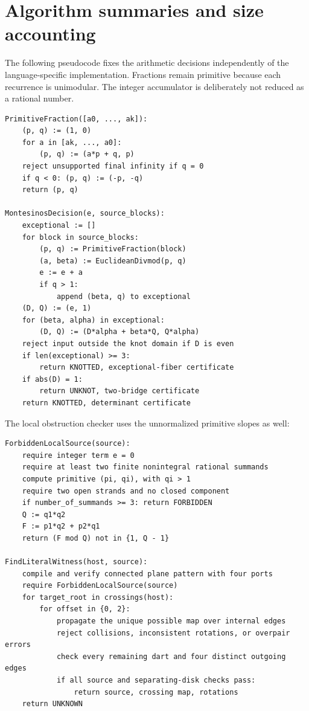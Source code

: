 \documentclass[11pt,a4paper]{article}
\theoremstyle{definition}
\theoremstyle{remark}
\numberwithin{equation}{section}
\begin{document}
\appendix
\section{Algorithm summaries and size accounting}
\label{sec:appendix}

The following pseudocode fixes the arithmetic decisions independently of
the language-specific implementation. Fractions remain primitive because
each recurrence is unimodular. The integer accumulator is deliberately
not reduced as a rational number.

\begin{lstlisting}
PrimitiveFraction([a0, ..., ak]):
    (p, q) := (1, 0)
    for a in [ak, ..., a0]:
        (p, q) := (a*p + q, p)
    reject unsupported final infinity if q = 0
    if q < 0: (p, q) := (-p, -q)
    return (p, q)

MontesinosDecision(e, source_blocks):
    exceptional := []
    for block in source_blocks:
        (p, q) := PrimitiveFraction(block)
        (a, beta) := EuclideanDivmod(p, q)
        e := e + a
        if q > 1:
            append (beta, q) to exceptional
    (D, Q) := (e, 1)
    for (beta, alpha) in exceptional:
        (D, Q) := (D*alpha + beta*Q, Q*alpha)
    reject input outside the knot domain if D is even
    if len(exceptional) >= 3:
        return KNOTTED, exceptional-fiber certificate
    if abs(D) = 1:
        return UNKNOT, two-bridge certificate
    return KNOTTED, determinant certificate
\end{lstlisting}

The local obstruction checker uses the unnormalized primitive slopes as
well:
\begin{lstlisting}
ForbiddenLocalSource(source):
    require integer term e = 0
    require at least two finite nonintegral rational summands
    compute primitive (pi, qi), with qi > 1
    require two open strands and no closed component
    if number_of_summands >= 3: return FORBIDDEN
    Q := q1*q2
    F := p1*q2 + p2*q1
    return (F mod Q) not in {1, Q - 1}

FindLiteralWitness(host, source):
    compile and verify connected plane pattern with four ports
    require ForbiddenLocalSource(source)
    for target_root in crossings(host):
        for offset in {0, 2}:
            propagate the unique possible map over internal edges
            reject collisions, inconsistent rotations, or overpair errors
            check every remaining dart and four distinct outgoing edges
            if all source and separating-disk checks pass:
                return source, crossing map, rotations
    return UNKNOWN
\end{lstlisting}
\end{document}

